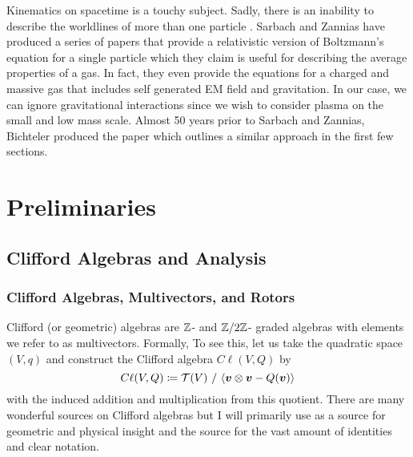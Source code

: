 \documentclass[conf]{new-aiaa}
\begin{document}
Kinematics on spacetime is a touchy subject. Sadly, there is an inability to describe the worldlines of more than one particle . Sarbach and Zannias have produced a series of papers \cite{sarbach_relativistic_2013, sarbach_tangent_2014, sarbach_geometry_2014} that provide a relativistic version of Boltzmann's equation for a single particle which they claim is useful for describing the average properties of a gas. In fact, they even provide the equations for a charged and massive gas that includes self generated EM field and gravitation. In our case, we can ignore gravitational interactions since we wish to consider plasma on the small and low mass scale. Almost 50 years prior to Sarbach and Zannias, Bichteler produced the paper \cite{bichteler_cauchy_1967} which outlines a similar approach in the first few sections.

\section{Preliminaries}

\subsection{Clifford Algebras and Analysis}

\subsubsection{Clifford Algebras, Multivectors, and Rotors}

Clifford (or geometric) algebras are $\mathbb{Z}$- and $\mathbb{Z}/2\mathbb{Z}$- graded algebras with elements we refer to as multivectors. Formally, To see this, let us take the quadratic space $(V,q)$ and construct the Clifford algebra $C\ell(V,Q)$ by
\begin{equation}
C\ell(V,Q) \coloneqq \mathcal{T}(V) ~ / ~ \langle \boldsymbol{v} \otimes \boldsymbol{v} - Q(\boldsymbol{v}) \rangle
\end{equation}
with the induced addition and multiplication from this quotient. There are many wonderful sources on Clifford algebras but I will primarily use \cite{doran_geometric_2003} as a source for geometric and physical insight and the source \cite{chisolm_geometric_2012} for the vast amount of identities and clear notation. 
\end{document}
